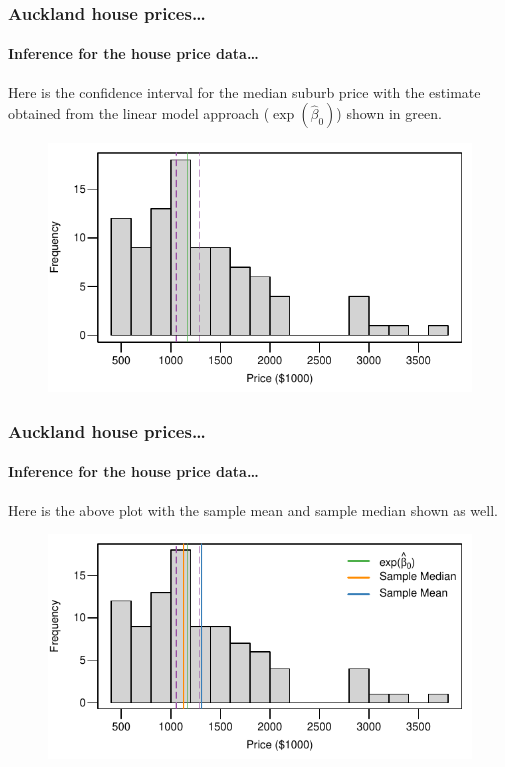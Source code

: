 \documentclass{beamer}\usepackage[]{graphicx}\usepackage[]{xcolor}
\begin{document}
\begin{frame}
\frametitle{Auckland house prices\ldots}
\framesubtitle{Inference for the house price data\ldots}

Here is the confidence interval for the median suburb price with the estimate obtained from the linear model approach ($\exp(\hat{\beta}_0)$) shown in green.


\begin{figure}
  \centering
  \includegraphics{figure/RC-H06-018}
\end{figure}

\end{frame}


\begin{frame}
\frametitle{Auckland house prices\ldots}
\framesubtitle{Inference for the house price data\ldots}

Here is the above plot with the sample mean and sample median shown as well.


\begin{figure}
  \centering
  \includegraphics{figure/RC-H06-019}
\end{figure}

\end{frame}
\end{document}
